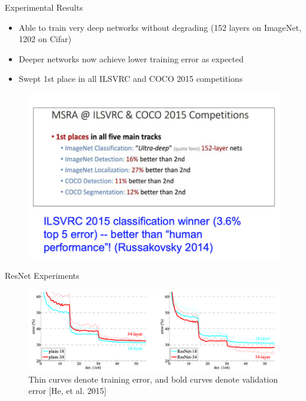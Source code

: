 \documentclass[serif, aspectratio=169]{beamer}
\begin{document}
\begin{frame}{Experimental Results}
	\begin{itemize}
		\item Able to train very deep networks without degrading (152 layers on ImageNet, 1202 on Cifar)
		\item Deeper networks now achieve lower training error as expected
		\item Swept 1st place in all ILSVRC and COCO 2015 competitions
	\end{itemize}
	
	\begin{figure}[htpb]
		\begin{center}
			\includegraphics[keepaspectratio, scale=0.23]{pic/resnet_result}
		\end{center}
	\end{figure}
\end{frame}

\begin{frame}{ResNet Experiments}
	\begin{figure}[htpb]
		\begin{center}
			\includegraphics[keepaspectratio, scale=0.22]{pic/ResNetExp}
			\caption*{\scriptsize Thin curves denote training error, and bold curves denote validation error [He, et al. 2015]}
		\end{center}
	\end{figure}
\end{frame}
\end{document}
